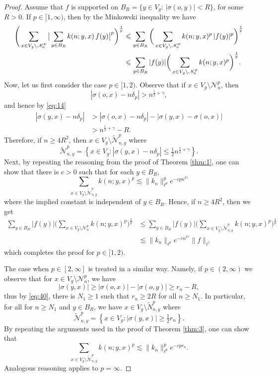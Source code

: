 \documentclass[11pt]{amsart}
\newcommand{\scrN}{\mathscr{N}}
\theoremstyle{plain}
\newcounter{thm}
\theoremstyle{definition}
\numberwithin{equation}{section}
\begin{document}
\begin{proof}
	Assume that $f$ is supported on $B_R= \{y \in V_g: \, |\sigma(o,y)|< R\}$, for some $R>0$. If $p \in [1, \infty)$,
	then by the Minkowski inequality we have
	\begin{align*}
		\Bigg(\sum_{x \in V_g \setminus \scrN_n^p} 
		\big| \sum_{y \in B_{R}} k(n; y, x) \, f(y) \big|^p \bigg)^{\frac{1}{p}}
		&\leqslant 
		\sum_{y\in B_{R}}
		\bigg( \sum_{x \in V_g \setminus \scrN_n^p} k(n;y,x)^p\, |f(y)|^p \bigg)^{\frac{1}{p}} \notag\\
		&\leqslant
		\sum_{y\in B_{R}}|f(y)|\bigg( \sum_{x \in V_g \setminus \scrN_n^p} k(n;y,x)^p \bigg)^{\frac{1}{p}}. 
	\end{align*}
	Now, let us first consider the case $p \in [1, 2)$. Observe that if $x \in V_g \setminus \scrN_n^p$, then 
	\[
		\left|\sigma(o,x)-n\delta_p\right|>n^{\frac{1}{2}+\gamma},
	\]
	and hence by \eqref{eq:14}
	\begin{align*}
		\left|\sigma(y,x)-n\delta_p\right|
		&> 
		\left|\sigma(o,x)-n\delta_p\right| - \left|\sigma(y,x)-\sigma(o,x)\right|\\
		&> 
		n^{\frac{1}{2}+\gamma}-R.
	\end{align*}
	Therefore, if $n \geqslant 4R^2$, then $x \in V_g \setminus \tilde{\scrN}_{n, y}^p$ where
	\[
		\tilde{\scrN}_{n, y}^p
		=
		\left\{x \in V_g: |\sigma(y,x) - n \delta_p | \leqslant \tfrac{1}{2} n^{\frac{1}{2}+\gamma} \right\}.
	\]
	Next, by repeating the reasoning from the proof of Theorem \ref{thm:1}, one can show that there is $c > 0$
	such that for each $y \in B_R$,
	\[
		\sum_{x \in V_g \setminus \tilde{\scrN}_{n, y}^p} k(n;y,x)^p
		\lesssim
		\|k_n\|_{\ell^p}^p e^{-c p n^{2\gamma}} 
	\]
	where the implied constant is independent of $y \in B_R$. Hence, if $n \geqslant 4R^2$, then we get
	\begin{align*}
		\sum_{y\in B_{R}}|f(y)|\bigg( \sum_{x \in V_g \setminus \scrN_n^p} k(n;y,x)^p \bigg)^{\frac{1}{p}}
		&\leqslant
		\sum_{y \in B_R} |f(y)| \bigg( \sum_{x \in V_g \setminus \tilde{\scrN}_{n, y}^p} k(n;y,x)^p \bigg)^{\frac{1}{p}} \\
		&\lesssim
		\|k_n\|_{\ell^p} e^{-c n^{2\gamma}} \|f\|_{\ell^1} 
	\end{align*}
	which completes the proof for $p \in [1, 2)$.
	
	The case when $p \in [2, \infty]$ is treated in a similar way. Namely, if $p \in (2, \infty)$ we observe that for
	$x \in V_g \setminus \scrN_n^p$, we have
	\[
		|\sigma(y,x)| \geqslant |\sigma(o, x)| - |\sigma(o, y)| \geqslant r_n - R,
	\]
	thus by \eqref{eq:40}, there is $N_1 \geqslant 1$ such that $r_n \geqslant 2 R$ for all $n \geqslant N_1$. In particular, 
	for all for $n \geqslant N_1$ and $y \in B_R$, we have $x \in V_g \setminus \tilde{N}_{n, y}^p$ where
	\[
		\tilde{\scrN}_{n, y}^p
		=\left\{
		x \in V_g : |\sigma(y, x)| \geqslant \tfrac{1}{2} r_n
		\right\}.
	\]
	By repeating the arguments used in the proof of Theorem \ref{thm:3}, one can show that
	\[
		\sum_{x \in V_g \setminus \tilde{\scrN}_{n, y}^p}
		k(n; y, x)^p
		\lesssim
		\|k_n\|_{\ell^p}^p e^{-c p r_n}.
	\]
	Analogous reasoning applies to $p = \infty$.


\end{proof}
\end{document}
